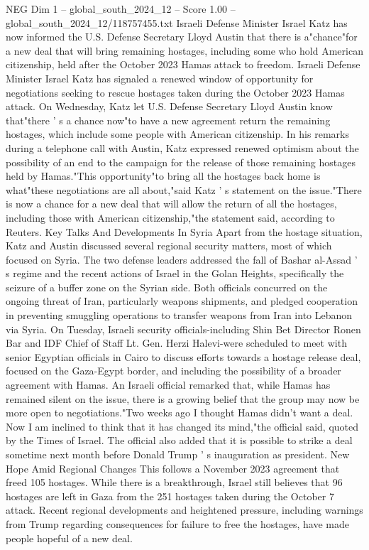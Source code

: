 \begin{textsample}{NEG Dim 1 – global\_south\_2024\_12 – Score 1.00 – global\_south\_2024\_12/118757455.txt}  \label{ex:f1_neg_344}
Israeli Defense Minister Israel Katz has now informed the U.S.
Defense Secretary Lloyd Austin that there is a"chance"for a new deal that will bring remaining hostages, including some who hold American citizenship, held after the October 2023 Hamas attack to freedom.
Israeli Defense Minister Israel Katz has signaled a renewed window of opportunity for negotiations seeking to rescue hostages taken during the October 2023 Hamas attack.
On Wednesday, Katz let U.S.
Defense Secretary Lloyd Austin know that"there ' s a chance now"to have a new agreement return the remaining hostages, which include some people with American citizenship.
In his remarks during a telephone call with Austin, Katz expressed renewed optimism about the possibility of an end to the campaign for the release of those remaining hostages held by Hamas."This opportunity"to bring all the hostages back home is what"these negotiations are all about,"said Katz ' s statement on the issue."There is now a chance for a new deal that will allow the return of all the hostages, including those with American citizenship,"the statement said, according to Reuters.
Key Talks And Developments In Syria Apart from the hostage situation, Katz and Austin discussed several regional security matters, most of which focused on Syria.
The two defense leaders addressed the fall of Bashar al-Assad ' s regime and the recent actions of Israel in the Golan Heights, specifically the seizure of a buffer zone on the Syrian side.
Both officials concurred on the ongoing threat of Iran, particularly weapons shipments, and pledged cooperation in preventing smuggling operations to transfer weapons from Iran into Lebanon via Syria.
On Tuesday, Israeli security officials-including Shin Bet Director Ronen Bar and IDF Chief of Staff Lt.
Gen.
Herzi Halevi-were scheduled to meet with senior Egyptian officials in Cairo to discuss efforts towards a hostage release deal, focused on the Gaza-Egypt border, and including the possibility of a broader agreement with Hamas.
An Israeli official remarked that, while Hamas has remained silent on the issue, there is a growing belief that the group may now be more open to negotiations."Two weeks ago I thought Hamas didn't want a deal.
Now I am inclined to think that it has changed its mind,"the official said, quoted by the Times of Israel.
The official also added that it is possible to strike a deal sometime next month before Donald Trump ' s inauguration as president.
New Hope Amid Regional Changes This follows a November 2023 agreement that freed 105 hostages.
While there is a breakthrough, Israel still believes that 96 hostages are left in Gaza from the 251 hostages taken during the October 7 attack.
Recent regional developments and heightened pressure, including warnings from Trump regarding consequences for failure to free the hostages, have made people hopeful of a new deal.

\end{textsample}

